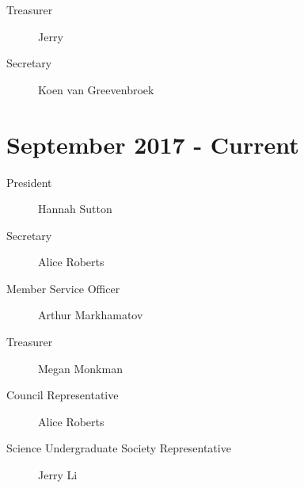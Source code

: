 \documentclass[12pt]{amsart}
\begin{document}
\begin{description}
\item[Treasurer] Jerry
\item[Secretary] Koen van Greevenbroek
\end{description}


\section*{September 2017 - Current}

\begin{description}
\item[President] Hannah Sutton
\item[Secretary] Alice Roberts
\item[Member Service Officer] Arthur Markhamatov
\item[Treasurer] Megan Monkman
\item[Council Representative] Alice Roberts
\item[Science Undergraduate Society Representative] Jerry Li
\end{description}
\end{document}
